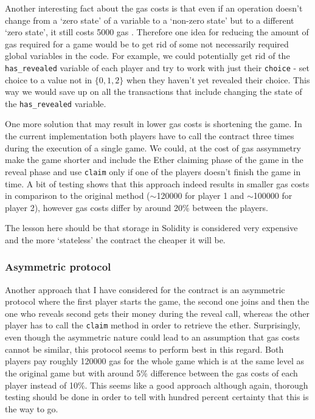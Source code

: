 \documentclass{article}
\begin{document}
    \noindent Another interesting fact about the gas costs
    is that even if an operation doesn't change from a `zero
    state' of a variable to a `non-zero state' but to a
    different `zero state', it still costs 5000 gas
    \cite{ypaper}. Therefore one idea for reducing the
    amount of gas required for a game would be to get rid of
    some not necessarily required global variables in the
    code. For example, we could potentially get rid of the
    \verb|has_revealed| variable of each player and try to
    work with just their \verb|choice| - set choice to a
    value not in \(\{0,1,2\}\) when they haven't yet
    revealed their choice. This way we would save up on all
    the transactions that include changing the state of the
    \verb|has_revealed| variable.
    \newline

    \noindent One more solution that may result in lower gas
    costs is shortening the game. In the current
    implementation both players have to call the contract
    three times during the execution of a single game. We
    could, at the cost of gas assymmetry make the game
    shorter and include the Ether claiming phase of the game
    in the reveal phase and use \verb|claim| only if one of
    the players doesn't finish the game in time. A bit of
    testing shows that this approach indeed results in
    smaller gas costs in comparison to the original method
    (\(\sim\)120000 for player 1 and \(\sim\)100000 for
    player 2), however gas costs differ by around 20\%
    between the players.
    \newline

    \noindent The lesson here should be that storage in
    Solidity is considered very expensive and the more
    `stateless' the contract the cheaper it will be.

    \subsubsection{Asymmetric protocol}
    Another approach that I have considered for the contract
    is an asymmetric protocol where the first player starts
    the game, the second one joins and then the one who
    reveals second gets their money during the reveal call,
    whereas the other player has to call the \verb|claim|
    method in order to retrieve the ether. Surprisingly,
    even though the asymmetric nature could lead to an
    assumption that gas costs cannot be similar, this
    protocol seems to perform best in this regard. Both
    players pay roughly 120000 gas for the whole game which
    is at the same level as the original game but with
    around 5\% difference between the gas costs of each
    player instead of 10\%. This seems like a good approach
    although again, thorough testing should be done in order
    to tell with hundred percent certainty that this is the
    way to go.
\end{document}
